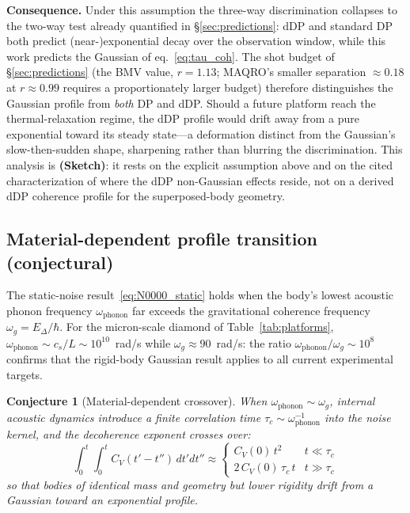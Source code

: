 \documentclass[12pt,a4paper]{article}
\newtheorem{conjecture}{Conjecture}
\theoremstyle{remark}
\begin{document}
\textbf{Consequence.} Under this assumption the three-way discrimination collapses to the
two-way test already quantified in \S\ref{sec:predictions}: dDP and standard DP both
predict (near-)exponential decay over the observation window, while this work predicts the
Gaussian of eq.~\eqref{eq:tau_coh}. The shot budget of \S\ref{sec:predictions} (the BMV
value, $r=1.13$; MAQRO's smaller separation $\approx 0.18$ at $r\approx 0.99$ requires a
proportionately larger budget) therefore distinguishes the Gaussian profile from \emph{both}
DP and dDP. Should a future platform
reach the thermal-relaxation regime, the dDP profile would drift away from a pure
exponential toward its steady state---a deformation distinct from the Gaussian's
slow-then-sudden shape, sharpening rather than blurring the discrimination. This analysis
is \textbf{(Sketch)}: it rests on the explicit assumption above and on the cited
characterization of where the dDP non-Gaussian effects reside, not on a derived dDP
coherence profile for the superposed-body geometry.

\subsection{Material-dependent profile transition (conjectural)}
\label{sec:material}

The static-noise result~\eqref{eq:N0000_static} holds when the body's lowest acoustic
phonon frequency $\omega_{\text{phonon}}$ far exceeds the gravitational coherence frequency
$\omega_g = E_\Delta/\hbar$. For the micron-scale diamond of Table~\ref{tab:platforms},
$\omega_{\text{phonon}} \sim c_s/L \sim 10^{10}$~rad/s while
$\omega_g \approx 90$~rad/s: the ratio
$\omega_{\text{phonon}}/\omega_g \sim 10^8$ confirms that the rigid-body Gaussian result
applies to all current experimental targets.

\begin{conjecture}[Material-dependent crossover]
\label{conj:material}
When $\omega_{\text{phonon}} \sim \omega_g$, internal acoustic dynamics introduce a finite
correlation time $\tau_c \sim \omega_{\text{phonon}}^{-1}$ into the noise kernel, and the
decoherence exponent crosses over:
\begin{equation}
\int_0^t\!\!\int_0^t C_V(t'-t'')\,dt'dt'' \approx
\begin{cases}
C_V(0)\,t^2 & t \ll \tau_c \\
2\,C_V(0)\,\tau_c\,t & t \gg \tau_c
\end{cases}
\label{eq:crossover}
\end{equation}
so that bodies of identical mass and geometry but lower rigidity drift from a Gaussian
toward an exponential profile.
\end{conjecture}
\end{document}
